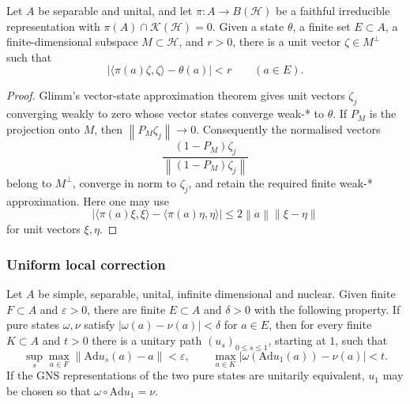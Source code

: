 \begin{lemma}\label{lem:cu-glimm-avoid}
 Let $A$ be separable and unital, and let $\pi:A\to B(\mathcal{H})$ be a faithful irreducible representation with $\pi(A)\cap \mathcal{K}(\mathcal{H})=0$. Given a state $\theta$, a finite set $E\subset
A $, a finite-dimensional subspace $M\subset\mathcal{H}$, and $r>0$, there
is a unit vector $\zeta\in M^\perp$ such that 
\begin{equation*}
\bigl|\langle\pi(a)\zeta,\zeta\rangle-\theta(a)\bigr|<r \qquad(a\in E).
\end{equation*}
\end{lemma}

\begin{proof}
Glimm's vector-state approximation theorem \cite{Glimm1961} gives unit vectors $\zeta_j$ converging weakly to zero whose vector states converge weak-* to $\theta$. If $P_M$ is the projection onto $M$, then $\left\|P_M\zeta_j\right \|\to0$. Consequently the normalised vectors 
\begin{equation*}
\frac{(1-P_M)\zeta_j}{\left\|(1-P_M)\zeta_j\right\|}
\end{equation*}
belong to $M^\perp$, converge in norm to $\zeta_j$, and retain the required
finite weak-* approximation. Here one may use 
\begin{equation*}
\bigl|\langle\pi(a)\xi,\xi\rangle- \langle\pi(a)\eta,\eta\rangle\bigr| \leq
2\left\|a\right\|\left\|\xi-\eta\right\|
\end{equation*}
for unit vectors $\xi,\eta$.
\end{proof}


\subsubsection{Uniform local correction}

\begin{proposition}\label{prop:cu-approx-alignment}
 Let $A$ be simple, separable, unital, infinite
dimensional and nuclear. Given finite $F\subset A$ and $\varepsilon>0$,
there are finite $E\subset A$ and $\delta>0$ with the following property. If
pure states $\omega,\nu$ satisfy $\left|\omega(a)-\nu(a)\right|<\delta$ for $a\in E$, then for every finite $K\subset A$ and $t>0$ there is a unitary
path $(u_s)_{0\leq s\leq1}$, starting at $1$, such that 
\begin{equation*}
\sup_s\max_{a\in F}\left\|\mathrm{Ad} u_s(a)-a\right\|<\varepsilon,\qquad
\max_{a\in K}\left|\omega(\mathrm{Ad} u_1(a))-\nu(a)\right|<t.
\end{equation*}
If the GNS representations of the two pure states are unitarily equivalent, $u_1$ may be chosen so that $\omega\circ\mathrm{Ad} u_1=\nu$.
\end{proposition}

